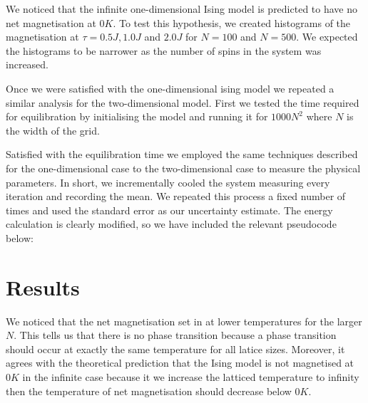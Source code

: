 \documentclass[a4paper]{article}
\begin{document}
\begin{multicols}{2}
        We noticed that the infinite one-dimensional Ising model is predicted %
        to have no net magnetisation at \(0K\). To test this hypothesis, %
        we created histograms of the magnetisation at \(\tau = 0.5J, 1.0J\) %
        and \(2.0J\) for \(N = 100\) and \(N = 500\). We expected the %
        histograms to be narrower as the number of spins in the system was %
        increased.


        Once we were satisfied with the one-dimensional ising model we %
        repeated a similar analysis for the two-dimensional model. %
        First we tested the time required for equilibration by initialising %
        the model and running it for \(1000N^{2}\) where \(N\) is the width %
        of the grid. 


        Satisfied with the equilibration time we employed the same techniques %
        described for the one-dimensional case to the two-dimensional case %
        to measure the physical parameters. In short, we incrementally cooled %
        the system measuring every iteration and recording the mean. We %
        repeated this process a fixed number of times and used the standard %
        error as our uncertainty estimate. The energy calculation is %
        clearly modified, so we have included the relevant pseudocode %
        below:


    \section*{Results}
        We noticed that the net magnetisation set in at lower temperatures for %
        the larger \(N\). This tells us that there is no phase transition %
        because a phase transition should occur at exactly the same %
        temperature for all latice sizes. Moreover, it agrees with the %
        theoretical prediction that the Ising model is not magnetised at %
        \(0K\) in the infinite case because it we increase the latticed %
        temperature to infinity then the temperature of net magnetisation %
        should decrease below \(0K\). 
    \end{multicols}
\end{document}
